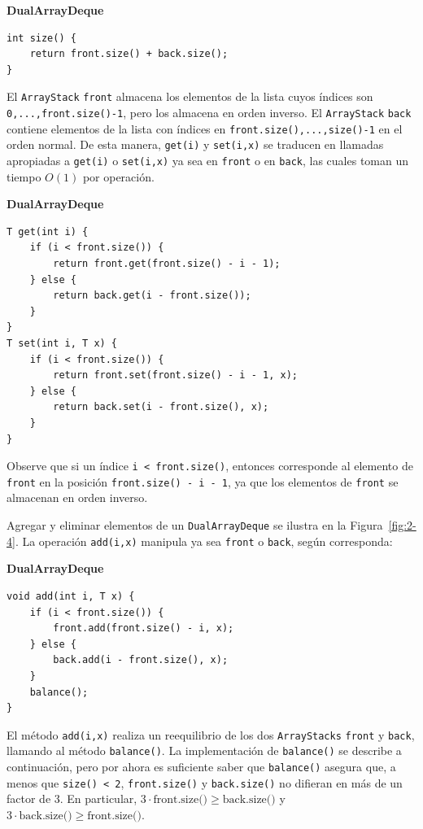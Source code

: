 \documentclass[11pt]{book}
\theoremstyle{plain}
\newcommand{\claseheader}[1]{\noindent\textbf{#1}\par\vspace{-4pt}}
\begin{document}
\claseheader{DualArrayDeque}
\begin{lstlisting}
int size() {
    return front.size() + back.size();
}
\end{lstlisting}

El \texttt{ArrayStack} \texttt{front} almacena los elementos de la lista cuyos índices son \texttt{0,...,front.size()-1}, pero los almacena en orden inverso. El \texttt{ArrayStack} \texttt{back} contiene elementos de la lista con índices en \texttt{front.size(),...,size()-1} en el orden normal. De esta manera, \texttt{get(i)} y \texttt{set(i,x)} se traducen en llamadas apropiadas a \texttt{get(i)} o \texttt{set(i,x)} ya sea en \texttt{front} o en \texttt{back}, las cuales toman un tiempo $O(1)$ por operación.

\claseheader{DualArrayDeque}
\begin{lstlisting}
T get(int i) {
    if (i < front.size()) {
        return front.get(front.size() - i - 1);
    } else {
        return back.get(i - front.size());
    }
}
T set(int i, T x) {
    if (i < front.size()) {
        return front.set(front.size() - i - 1, x);
    } else {
        return back.set(i - front.size(), x);
    }
}
\end{lstlisting}

Observe que si un índice \texttt{i < front.size()}, entonces corresponde al elemento de \texttt{front} en la posición \texttt{front.size() - i - 1}, ya que los elementos de \texttt{front} se almacenan en orden inverso.

Agregar y eliminar elementos de un \texttt{DualArrayDeque} se ilustra en la Figura~\ref{fig:2-4}. La operación \texttt{add(i,x)} manipula ya sea \texttt{front} o \texttt{back}, según corresponda:

\claseheader{DualArrayDeque}
\begin{lstlisting}
void add(int i, T x) {
    if (i < front.size()) {
        front.add(front.size() - i, x);
    } else {
        back.add(i - front.size(), x);
    }
    balance();
}
\end{lstlisting}

El método \texttt{add(i,x)} realiza un reequilibrio de los dos \texttt{ArrayStacks} \texttt{front} y \texttt{back}, llamando al método \texttt{balance()}. La implementación de \texttt{balance()} se describe a continuación, pero por ahora es suficiente saber que \texttt{balance()} asegura que, a menos que \texttt{size() < 2}, \texttt{front.size()} y \texttt{back.size()} no difieran en más de un factor de 3. En particular, $3 \cdot \text{front.size()} \ge \text{back.size()}$ y $3 \cdot \text{back.size()} \ge \text{front.size()}$.
\end{document}
